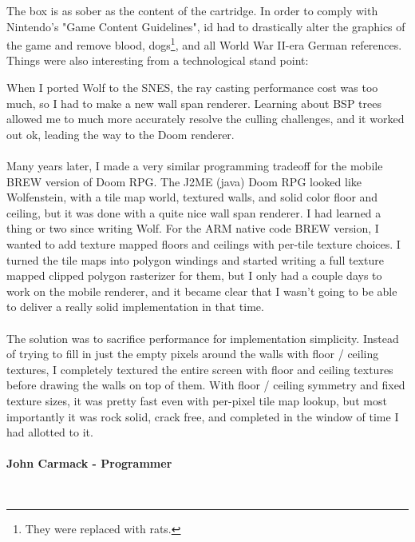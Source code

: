 \documentclass[book.tex]{subfiles}
\begin{document}
\par
\begin{figure}[H]
\centering
 \end{figure}
 \par
The box is as sober as the content of the cartridge. In order to comply with Nintendo's "Game Content Guidelines", id had to drastically alter the graphics of the game and remove blood, dogs\footnote{They were replaced with rats.}, and all World War II-era German references. Things were also interesting from a technological stand point:\\
\par

\begin{fancyquotes}
    When I ported Wolf to the SNES, the ray casting performance cost was too much, so I had to make a new wall span renderer.  Learning about BSP trees allowed me  to much more accurately resolve the culling challenges, and it worked out ok, leading the way to the Doom renderer.\\
\\
Many years later, I made a very similar programming tradeoff for the mobile BREW version of Doom RPG.  The J2ME (java) Doom RPG looked like Wolfenstein, with a tile map world, textured walls, and solid color floor and ceiling, but it was done with a quite nice wall span renderer.  I had learned a thing or two since writing Wolf.  For the ARM native code BREW version, I wanted to add texture mapped floors and ceilings with per-tile texture choices.  I turned the tile maps into polygon windings and started writing a full texture mapped clipped polygon rasterizer for them, but I only had a couple days to work on the mobile renderer, and it became clear that I wasn't going to be able to deliver a really solid implementation in that time.\\
 \\
The solution was to sacrifice performance for implementation simplicity.  Instead of trying to fill in just the empty pixels around the walls with floor / ceiling textures, I completely textured the entire screen with floor and ceiling textures before drawing the walls on top of them.  With floor / ceiling symmetry and fixed texture sizes, it was pretty fast even with per-pixel tile map lookup, but most importantly it was rock solid, crack free, and completed in the window of time I had allotted to it.\\
\\
\textbf{John Carmack - Programmer}
\end{fancyquotes}\\
\end{document}

